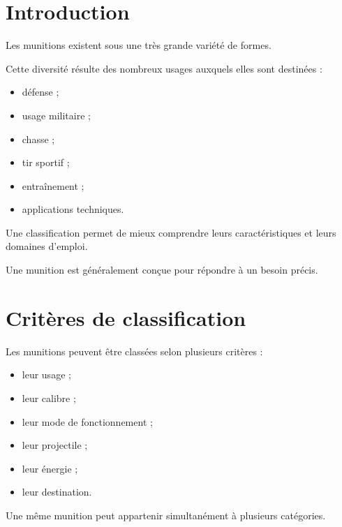 
\section{Introduction}

Les munitions existent sous une très grande variété de formes.

Cette diversité résulte des nombreux usages auxquels elles sont destinées :

\begin{itemize}
    \item défense ;
    \item usage militaire ;
    \item chasse ;
    \item tir sportif ;
    \item entraînement ;
    \item applications techniques.
\end{itemize}

Une classification permet de mieux comprendre leurs caractéristiques et leurs
domaines d'emploi.

\begin{aretenir}

Une munition est généralement conçue pour répondre à un besoin précis.

\end{aretenir}

\section{Critères de classification}

Les munitions peuvent être classées selon plusieurs critères :

\begin{itemize}
    \item leur usage ;
    \item leur calibre ;
    \item leur mode de fonctionnement ;
    \item leur projectile ;
    \item leur énergie ;
    \item leur destination.
\end{itemize}

Une même munition peut appartenir simultanément à plusieurs catégories.

